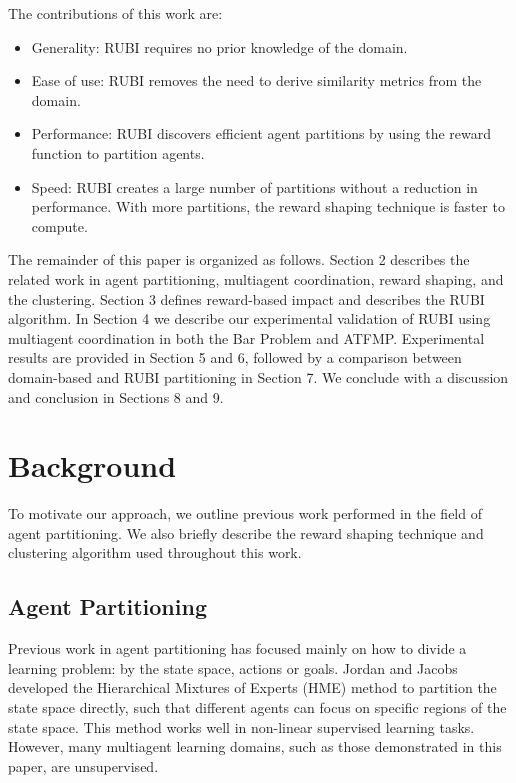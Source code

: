 \documentclass[smallcondensed]{svjour3}
\begin{document}
The contributions of this work are:
\begin{itemize} 
\item Generality: RUBI requires no prior knowledge of the domain. \\
\item Ease of use: RUBI removes the need to derive similarity metrics from the domain. \\
\item Performance: RUBI discovers efficient agent partitions by using the reward function to partition agents. \\
\item Speed: RUBI creates a large number of partitions without a reduction in performance. With more partitions, the reward shaping technique is faster to compute. \\
\end{itemize} 
 
The remainder of this paper is organized as follows. Section 2 describes the related work in agent partitioning, multiagent coordination, reward shaping, and the clustering. Section 3 defines reward-based impact and describes the RUBI algorithm. In Section 4 we describe our experimental validation of RUBI using multiagent coordination in both the Bar Problem and ATFMP. Experimental results are provided in Section 5 and 6, followed by  a comparison between domain-based and RUBI partitioning in Section 7. We conclude with a discussion and conclusion in Sections 8 and 9.

\section{Background}
\label{sec:BACKGROUND}

To motivate our approach, we outline previous work performed in the field of agent partitioning. We also briefly describe the reward shaping technique and clustering algorithm used throughout this work.

\subsection{Agent Partitioning}
Previous work in agent partitioning has focused mainly on how to divide a learning problem: by the state space, actions or goals. Jordan and Jacobs \cite{716791} developed the Hierarchical Mixtures of Experts (HME) method to partition the state space directly, such that different agents can focus on specific regions of the state space. This method works well in non-linear supervised learning tasks. However, many multiagent learning domains, such as those demonstrated in this paper, are unsupervised.
\end{document}
